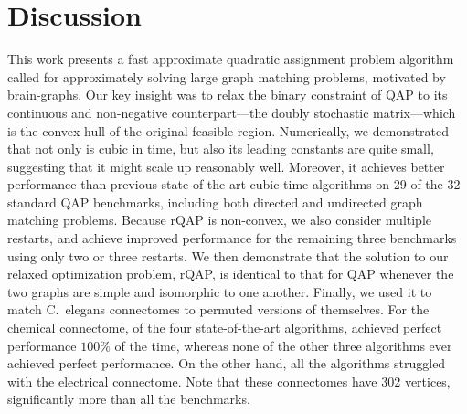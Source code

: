 \documentclass[10pt,journal,cspaper,compsoc]{IEEEtran}
\begin{document}

 


\section{Discussion}
\label{sec:discussion}

This work presents a fast approximate quadratic assignment problem algorithm called \FAQ for approximately solving large graph matching problems, motivated by brain-graphs.  Our key insight was to relax the binary constraint of QAP to its continuous and non-negative counterpart---the doubly stochastic matrix---which is the convex hull of the original feasible region.  
Numerically, we demonstrated that not only is \FAQ cubic in time, but also its leading constants are quite small, suggesting that it might scale up reasonably well.  Moreover, it achieves better performance than previous state-of-the-art cubic-time algorithms on 29 of the 32 standard QAP benchmarks, including both directed and undirected graph matching problems.  Because rQAP is non-convex, we also consider multiple restarts, and achieve improved performance for the remaining three benchmarks using only two or three restarts.  We then demonstrate that the solution to our relaxed optimization problem, rQAP, is identical to that for QAP whenever the two graphs are simple and isomorphic to one another.  Finally, we used it to match C.~elegans connectomes to permuted versions of themselves. For the chemical connectome, of the four state-of-the-art algorithms, \FAQ achieved perfect performance $100\%$ of the time, whereas none of the other three algorithms ever achieved perfect performance. On the other hand, all the algorithms struggled with the electrical connectome.   Note that these connectomes have 302 vertices, significantly more than all the benchmarks. 
\end{document}
